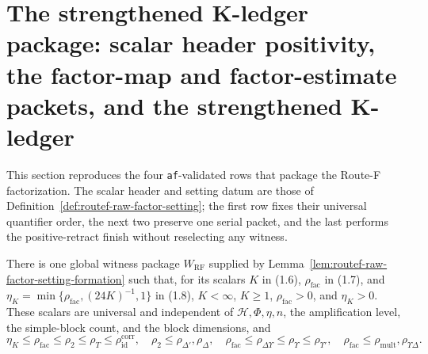 \section{The strengthened K-ledger package: scalar header positivity, the factor-map and factor-estimate packets, and the strengthened K-ledger}\label{sec:routef-kledger-package}

This section reproduces the four \texttt{af}-validated rows that package the Route-F
factorization.  The scalar header and setting datum are those of
Definition~\ref{def:routef-raw-factor-setting}; the first row fixes their universal
quantifier order, the next two preserve one serial packet, and the last performs the
positive-retract finish without reselecting any witness.

\begin{lemma}\label{lem:routef-scalar-header-positivity}
There is one global witness package $W_{\mathrm{RF}}$ supplied by
Lemma~\ref{lem:routef-raw-factor-setting-formation} such that, for its scalars
$K$ in (1.6), $\rho_{\mathrm{fac}}$ in (1.7), and
$\eta_K=\min\{\rho_{\mathrm{fac}},(24K)^{-1},1\}$ in (1.8),
$K<\infty$, $K\ge1$, $\rho_{\mathrm{fac}}>0$, and $\eta_K>0$.  These scalars are
universal and independent of $\mathcal H,\Phi,\eta,n$, the amplification level, the
simple-block count, and the block dimensions, and
\[
 \eta_K\le\rho_{\mathrm{fac}}\le\rho_2\le\rho_T\le\rho_{\mathrm{id}}^{\mathrm{corr}},
 \quad \rho_2\le\rho_{\Delta'},\rho_\Delta,
 \quad \rho_{\mathrm{fac}}\le\rho_{\Delta\Upsilon}\le\rho_\Upsilon\le\rho_{\Upsilon'},
 \quad \rho_{\mathrm{fac}}\le\rho_{\mathrm{mult}},\rho_{\Upsilon\Delta}.
\]
\end{lemma}

